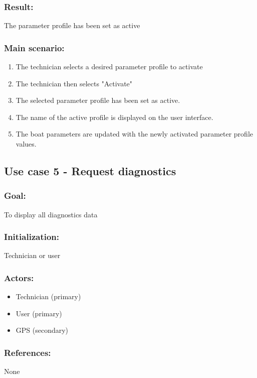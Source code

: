 \subsubsection*{Result:}
The parameter profile has been set as active

\subsubsection*{Main scenario:}
\begin{enumerate}
	\item The technician selects a desired parameter profile to activate
	\item The technician then selects "Activate"
	\item The selected parameter profile has been set as active.
	\item The name of the active profile is displayed on the user interface.
	\item The boat parameters are updated with the newly activated parameter profile values.
\end{enumerate}


\subsection{Use case 5 - Request diagnostics}
\subsubsection*{Goal:}
To display all diagnostics data

\subsubsection*{Initialization:}
Technician or user

\subsubsection*{Actors:}
\begin{itemize}
	\item Technician (primary)
	\item User (primary)
	\item GPS (secondary)
\end{itemize}

\subsubsection*{References:}
None

